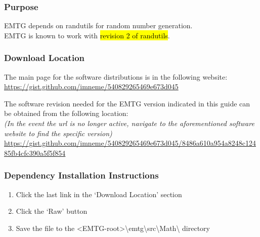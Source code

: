 
\subsubsection{Purpose}
\ac{EMTG} depends on randutils for random number generation. \\ \ac{EMTG} is known to work with \hl{revision 2 of randutils}.

\subsubsection{Download Location}
\noindent The main page for the software distributions is in the following website: \\
\url{https://gist.github.com/imneme/540829265469e673d045}

\noindent The software revision needed for the EMTG version indicated in this guide can be obtained from the following location: \\
\emph{(In the event the url is no longer active, navigate to the aforementioned software website to find the specific version)} \\
\url{https://gist.github.com/imneme/540829265469e673d045/8486a610a954a8248c12485fb4cfc390a5f5f854}

\subsubsection{Dependency Installation Instructions}
\begin{enumerate}
	\item Click the last link in the ‘Download Location’ section
	\item Click the ‘Raw’ button
	\item Save the file to the \textless EMTG-root\textgreater \textbackslash emtg\textbackslash src\textbackslash Math\textbackslash \hspace{1pt} directory
\end{enumerate}